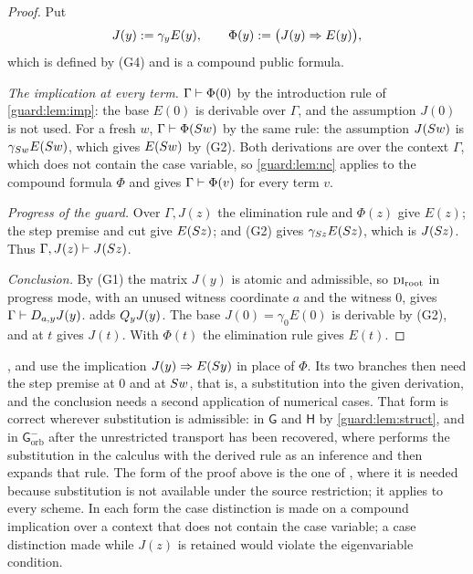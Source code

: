 \begin{proof}
Put
\[
 J(y)\mathrel{:=}\gamma_yE(y),\qquad \Phi(y)\mathrel{:=}\bigl(J(y)\Rightarrow E(y)\bigr),
\]
which is defined by (G4) and is a compound public formula.

\emph{The implication at every term.}  $\Gamma\vdash\Phi(0)$ by the
introduction rule of \cref{guard:lem:imp}: the base $E(0)$ is derivable
over $\Gamma$, and the assumption $J(0)$ is not used.  For a fresh $w$,
$\Gamma\vdash\Phi(S w)$ by the same rule: the assumption $J(S w)$ is
$\gamma_{S w}E(S w)$, which gives $E(S w)$ by (G2).  Both
derivations are over the context $\Gamma$, which does not contain the case
variable, so \cref{guard:lem:nc} applies to the compound formula $\Phi$ and
gives $\Gamma\vdash\Phi(v)$ for every term $v$.

\emph{Progress of the guard.}  Over $\Gamma,J(z)$ the elimination rule and
$\Phi(z)$ give $E(z)$; the step premise and cut give $E(S z)$; and (G2)
gives $\gamma_{S z}E(S z)$, which is $J(S z)$.  Thus
$\Gamma,J(z)\vdash J(S z)$.

\emph{Conclusion.}  By (G1) the matrix $J(y)$ is atomic and admissible, so
$\rulename{DI}_{\mathrm{root}}$ in progress mode, with an unused witness
coordinate $a$ and the witness $0$, gives $\Gamma\vdash D_{a,y}J(y)$.
 adds $Q_{y}J(y)$.  The base $J(0)=\gamma_0E(0)$ is derivable by
(G2), and  at $t$ gives $J(t)$.  With $\Phi(t)$ the elimination
rule gives $E(t)$.
\end{proof}

\begin{remark}
\label{guard:rem:ei-forms}
,  and  use the
implication $J(y)\Rightarrow E(S y)$ in place of $\Phi$.  Its two
branches then need the step premise at $0$ and at $S w$, that is, a
substitution into the given derivation, and the conclusion needs a second
application of numerical cases.  That form is correct wherever substitution
is admissible: in $\mathsf G$ and $\mathsf H$ by \cref{guard:lem:struct},
and in $\mathsf G^{-}_{\mathrm{orb}}$ after the unrestricted transport has
been recovered, where  performs the substitution in the
calculus with the derived rule as an inference and then expands that rule.
The form of the proof above is the one of , where it is
needed because substitution is not available under the source restriction;
it applies to every scheme.  In each form the case distinction is made on a
compound implication over a context that does not contain the case variable;
a case distinction made while $J(z)$ is retained would violate the
eigenvariable condition.
\end{remark}

